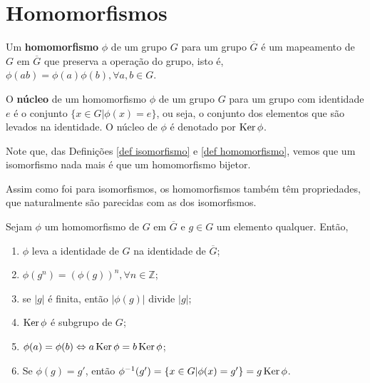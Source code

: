 \section{Homomorfismos}
\label{sec-homomorfismos}

    \begin{deff}
		\label{def homomorfismo}
		Um \textbf{homomorfismo} $\phi$ de um grupo $G$ para um grupo $\overline{G}$ é um mapeamento de $G$ em $\overline{G}$ que preserva a operação do grupo, isto é, $\phi(ab) = \phi(a)\phi(b), \forall a,b\in G$.
	\end{deff}
	
	\begin{deff}
		\label{def nucleo}
		O \textbf{núcleo} de um homomorfismo $\phi$ de um grupo $G$ para um grupo com identidade $e$ é o conjunto $\{ x\in G | \phi(x) = e \}$, ou seja, o conjunto dos elementos que são levados na identidade. O núcleo de $\phi$ é denotado por $\operatorname{Ker}\phi$.
	\end{deff}
	
	\begin{remark}
		Note que, das Definições \eqref{def isomorfismo} e \eqref{def homomorfismo}, vemos que um isomorfismo nada mais é que um homomorfismo bijetor.
	\end{remark}
	\par\vspace{0.3cm} Assim como foi para isomorfismos, os homomorfismos também têm propriedades, que naturalmente são parecidas com as dos isomorfismos.
	\begin{theorem}
		\label{homomorfismos em elementos}
		Sejam $\phi$ um homomorfismo de $G$ em $\overline{G}$ e $g\in G$ um elemento qualquer. Então, 
		\begin{enumerate}
			\item $\phi$ leva a identidade de $G$ na identidade de $\overline{G}$;
			\item $\phi(g^n) = (\phi(g))^n, \forall n\in \mathbb{Z}$;
			\item se $|g|$ é finita, então $|\phi(g)|$ divide $|g|$;
			\item $\operatorname{Ker}\phi$ é subgrupo de $G$;
			\item $\phi(a) = \phi(b) \Leftrightarrow a\operatorname{Ker}\phi = b\operatorname{Ker}\phi$;
			\item Se $\phi(g) = g'$, então $\phi^{-1}(g') = \{ x\in G | \phi(x) = g' \} = g\operatorname{Ker}\phi$.
		\end{enumerate}
	\end{theorem}
	
